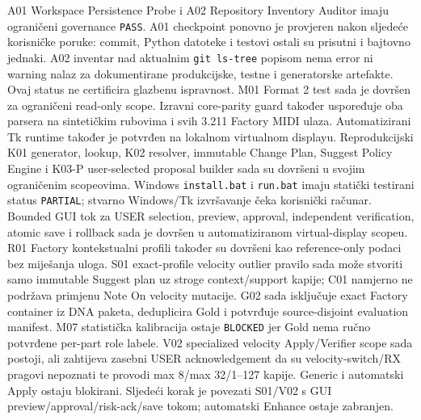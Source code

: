 \documentclass[11pt]{article}
\begin{document}
A01 Workspace Persistence Probe i A02 Repository Inventory Auditor imaju
ograničeni governance \texttt{PASS}. A01 checkpoint ponovno je provjeren nakon
sljedeće korisničke poruke: commit, Python datoteke i testovi ostali su prisutni
i bajtovno jednaki. A02 inventar nad aktualnim \texttt{git ls-tree} popisom
nema error ni warning nalaz za dokumentirane produkcijske, testne i generatorske
artefakte. Ovaj status ne certificira glazbenu ispravnost. M01 Format 2 test
sada je dovršen za ograničeni read-only scope. Izravni core-parity guard također
uspoređuje oba parsera na sintetičkim rubovima i svih 3.211 Factory MIDI
ulaza. Automatizirani Tk runtime također je potvrđen na lokalnom virtualnom
displayu. Reprodukcijski K01 generator, lookup, K02 resolver, immutable Change
Plan, Suggest Policy Engine i K03-P user-selected proposal builder sada su
dovršeni u svojim ograničenim scopeovima. Windows \texttt{install.bat} i
\texttt{run.bat} imaju statički testirani status \texttt{PARTIAL}; stvarno
Windows/Tk izvršavanje čeka korisnički računar. Bounded GUI tok za USER
selection, preview, approval, independent verification, atomic save i rollback
sada je dovršen u automatiziranom virtual-display scopeu. R01 Factory
kontekstualni profili također su dovršeni kao reference-only podaci bez
miješanja uloga. S01 exact-profile velocity outlier pravilo sada može stvoriti
samo immutable Suggest plan uz stroge context/support kapije; C01 namjerno ne
podržava primjenu Note On velocity mutacije. G02 sada isključuje exact Factory
container iz DNA paketa, deduplicira Gold i potvrđuje source-disjoint evaluation
manifest. M07 statistička kalibracija ostaje \texttt{BLOCKED} jer Gold nema
ručno potvrđene per-part role labele. V02 specialized velocity Apply/Verifier
scope sada postoji, ali zahtijeva zasebni USER acknowledgement da su
velocity-switch/RX pragovi nepoznati te provodi max 8/max 32/1--127 kapije.
Generic i automatski Apply ostaju blokirani. Sljedeći korak je povezati S01/V02
s GUI preview/approval/risk-ack/save tokom; automatski Enhance ostaje zabranjen.
\end{document}

